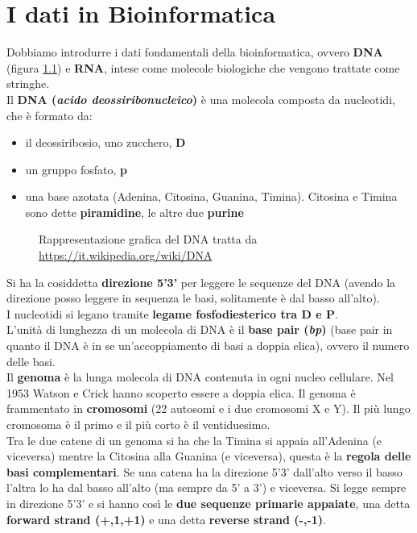\documentclass[a4paper,12pt, oneside]{book}
\begin{document}
\chapter{I dati in Bioinformatica}
Dobbiamo introdurre i dati fondamentali della bioinformatica, ovvero
\textbf{DNA} (figura \ref{fig:dna}) e \textbf{RNA}, intese come molecole
biologiche che vengono trattate come stringhe.\\
Il \textbf{DNA (\textit{acido deossiribonucleico})} è una molecola composta da
nucleotidi, che è formato da:
\begin{itemize}
  \item il deossiribosio, uno zucchero, \textbf{D}
  \item un gruppo fosfato, \textbf{p}
  \item una base azotata (Adenina, Citosina, Guanina, Timina). Citosina e Timina
  sono dette \textbf{piramidine}, le altre due \textbf{purine}
\end{itemize}
\begin{figure}
  \centering
  
  \caption{Rappresentazione grafica del
    DNA tratta da \url{https://it.wikipedia.org/wiki/DNA}} 
  \label{fig:dna}
\end{figure}
Si ha la cosiddetta \textbf{direzione 5'3'} per leggere le sequenze del DNA
(avendo la direzione posso leggere in sequenza le basi, solitamente è dal basso
all'alto).\\
I nucleotidi si legano tramite \textbf{legame fosfodiesterico tra D e P}. \\
L'unità di lunghezza di un molecola di DNA è il \textbf{base pair
  (\textit{bp})} (base pair in quanto il DNA è in se un'accoppiamento di basi a
doppia elica), ovvero il numero delle basi.\\
Il \textbf{genoma} è la lunga molecola di DNA contenuta in ogni nucleo
cellulare. Nel 1953 Watson e Crick hanno scoperto essere a doppia elica. Il
genoma è frammentato in \textbf{cromosomi} (22 autosomi e i due cromosomi X e
Y). Il più lungo cromosoma è il primo e il più corto è il ventiduesimo.\\
Tra le due catene di un genoma si ha che la Timina si appaia all'Adenina (e
viceversa) mentre la Citosina alla Guanina (e viceversa), questa è la
\textbf{regola delle basi complementari}. Se una catena ha la
direzione 5'3' dall'alto verso il basso l'altra lo ha dal basso all'alto (ma
sempre da 5' a 3') e viceversa. Si legge sempre in direzione 5'3' e si hanno
così le \textbf{due sequenze primarie appaiate}, una detta \textbf{forward
  strand (+,1,+1)} e una detta \textbf{reverse strand (-,-1)}.\\
\end{document}
